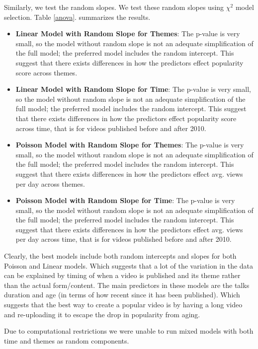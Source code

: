 Similarly, we test the random slopes. We test these random slopes using $\chi^2$ model selection. Table \ref{anova}. summarizes the results.
\begin{itemize}
	\item \textbf{Linear Model with Random Slope for Themes}: The p-value is very small, so the model without random slope is not an adequate simplification of the full model; the preferred model includes the random intercept. This suggest that there exists differences in how the predictors effect popularity score across themes.
	\item \textbf{Linear Model with Random Slope for Time}: The p-value is very small, so the model without random slope is not an adequate simplification of the full model; the preferred model includes the random intercept. This suggest that there exists differences in how the predictors effect popularity score across time, that is for videos published before and after 2010.
	\item \textbf{Poisson Model with Random Slope for Themes}: The p-value is very small, so the model without random slope is not an adequate simplification of the full model; the preferred model includes the random intercept. This suggest that there exists differences in how the predictors effect avg. views per day across themes.
	\item \textbf{Poisson Model with Random Slope for Time}: The p-value is very small, so the model without random slope is not an adequate simplification of the full model; the preferred model includes the random intercept. This suggest that there exists differences in how the predictors effect avg. views per day across time, that is for videos published before and after 2010.
\end{itemize}

Clearly, the best models include both random intercepts and slopes for both Poisson and Linear models. Which suggests that a lot of the variation in the data can be explained by timing of when a video is published and its theme rather than the actual form/content. The main predictors in these models are the talks duration and age (in terms of how recent since it has been published). Which suggests that the best way to create a popular video is by having a long video and re-uploading it to escape the drop in popularity from aging.


Due to computational restrictions we were unable to run mixed models with both time and themes as random components.













